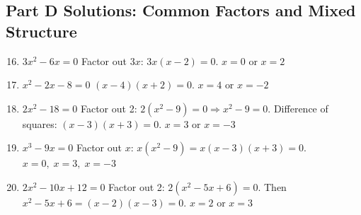 \documentclass[14pt]{extarticle}
\begin{document}
\subsection*{Part D Solutions: Common Factors and Mixed Structure}
\begin{enumerate}
  \setcounter{enumi}{15}
  \item \(3x^2 - 6x = 0\)  
  Factor out \(3x\): \(3x(x - 2) = 0.\)  
  \(\boxed{x = 0 \text{ or } x = 2}\)

  \item \(x^2 - 2x - 8 = 0\)  
  \((x - 4)(x + 2) = 0.\)  
  \(\boxed{x = 4 \text{ or } x = -2}\)

  \item \(2x^2 - 18 = 0\)  
  Factor out 2: \(2(x^2 - 9) = 0 \Rightarrow x^2 - 9 = 0.\)  
  Difference of squares: \((x - 3)(x + 3) = 0.\)  
  \(\boxed{x = 3 \text{ or } x = -3}\)

  \item \(x^3 - 9x = 0\)  
  Factor out \(x\):  
  \(x(x^2 - 9) = x(x - 3)(x + 3) = 0.\)  
  \(\boxed{x = 0,\; x = 3,\; x = -3}\)

  \item \(2x^2 - 10x + 12 = 0\)  
  Factor out 2: \(2(x^2 - 5x + 6) = 0.\)  
  Then \(x^2 - 5x + 6 = (x - 2)(x - 3) = 0.\)  
  \(\boxed{x = 2 \text{ or } x = 3}\)
\end{enumerate}
\end{document}
